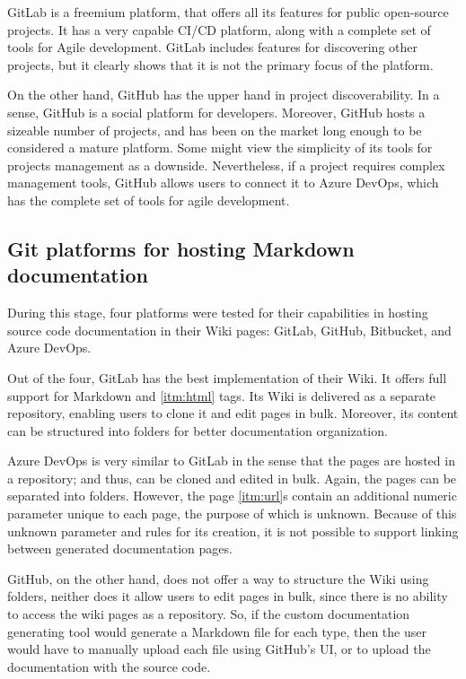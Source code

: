 GitLab is a freemium platform, that offers all its features for public open-source projects. It has a very capable CI/CD platform, along with a complete set of tools for Agile development. GitLab includes features for discovering other projects, but it clearly shows that it is not the primary focus of the platform.

On the other hand, GitHub has the upper hand in project discoverability. In a sense, GitHub is a social platform for developers. Moreover, GitHub hosts a sizeable number of projects, and has been on the market long enough to be considered a mature platform. Some might view the simplicity of its tools for projects management as a downside. Nevertheless, if a project requires complex management tools, GitHub allows users to connect it to Azure DevOps, which has the complete set of tools for agile development.

\subsection{Git platforms for hosting Markdown documentation}

During this stage, four platforms were tested for their capabilities in hosting source code documentation in their Wiki pages: GitLab, GitHub, Bitbucket, and Azure DevOps.

Out of the four, GitLab has the best implementation of their Wiki. It offers full support for Markdown and \ref{itm:html} tags.
Its Wiki is delivered as a separate repository, enabling users to clone it and edit pages in bulk. Moreover, its content can be structured into folders for better documentation organization.

Azure DevOps is very similar to GitLab in the sense that the pages are hosted in a repository; and thus, can be cloned and edited in bulk. Again, the pages can be separated into folders. However, the page \ref{itm:url}s contain an additional numeric parameter unique to each page, the purpose of which is unknown. Because of this unknown parameter and rules for its creation, it is not possible to support linking between generated documentation pages.

GitHub, on the other hand, does not offer a way to structure the Wiki using folders, neither does it allow users to edit pages in bulk, since there is no ability to access the wiki pages as a repository. So, if the custom documentation generating tool would generate a Markdown file for each type, then the user would have to manually upload each file using GitHub's UI, or to upload the documentation with the source code.

